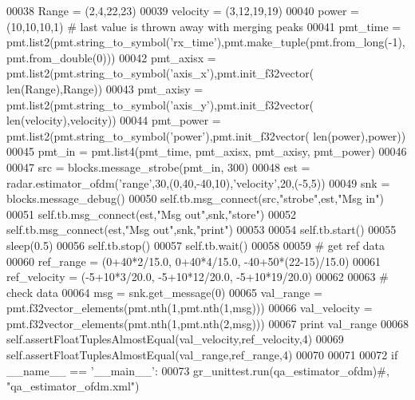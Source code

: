\begin{DoxyCode}
00038         Range = (2,4,22,23)
00039         velocity = (3,12,19,19)
00040         power = (10,10,10,1) \textcolor{comment}{# last value is thrown away with merging peaks}
00041         pmt\_time = pmt.list2(pmt.string\_to\_symbol(\textcolor{stringliteral}{'rx\_time'}),pmt.make\_tuple(pmt.from\_long(-1),
      pmt.from\_double(0)))
00042         pmt\_axisx = pmt.list2(pmt.string\_to\_symbol(\textcolor{stringliteral}{'axis\_x'}),pmt.init\_f32vector(
      len(Range),Range))
00043         pmt\_axisy = pmt.list2(pmt.string\_to\_symbol(\textcolor{stringliteral}{'axis\_y'}),pmt.init\_f32vector(
      len(velocity),velocity))
00044         pmt\_power = pmt.list2(pmt.string\_to\_symbol(\textcolor{stringliteral}{'power'}),pmt.init\_f32vector(
      len(power),power))
00045         pmt\_in = pmt.list4(pmt\_time, pmt\_axisx, pmt\_axisy, pmt\_power)
00046         
00047         src = blocks.message\_strobe(pmt\_in, 300)
00048         est = radar.estimator\_ofdm(\textcolor{stringliteral}{'range'},30,(0,40,-40,10),\textcolor{stringliteral}{'velocity'},20,(-5,5))
00049         snk = blocks.message\_debug()
00050         self.tb.msg\_connect(src,\textcolor{stringliteral}{"strobe"},est,\textcolor{stringliteral}{"Msg in"})
00051         self.tb.msg\_connect(est,\textcolor{stringliteral}{"Msg out"},snk,\textcolor{stringliteral}{"store"})
00052         self.tb.msg\_connect(est,\textcolor{stringliteral}{"Msg out"},snk,\textcolor{stringliteral}{"print"})
00053         
00054         self.tb.start()
00055         sleep(0.5)
00056         self.tb.stop()
00057         self.tb.wait()
00058         
00059         \textcolor{comment}{# get ref data}
00060         ref\_range = (0+40*2/15.0, 0+40*4/15.0, -40+50*(22-15)/15.0)
00061         ref\_velocity = (-5+10*3/20.0, -5+10*12/20.0, -5+10*19/20.0)
00062         
00063         \textcolor{comment}{# check data}
00064         msg = snk.get\_message(0)
00065         val\_range = pmt.f32vector\_elements(pmt.nth(1,pmt.nth(1,msg)))
00066         val\_velocity = pmt.f32vector\_elements(pmt.nth(1,pmt.nth(2,msg)))
00067         \textcolor{keywordflow}{print} val\_range
00068         self.assertFloatTuplesAlmostEqual(val\_velocity,ref\_velocity,4)
00069         self.assertFloatTuplesAlmostEqual(val\_range,ref\_range,4)
00070 
00071 
00072 \textcolor{keywordflow}{if} \_\_name\_\_ == \textcolor{stringliteral}{'\_\_main\_\_'}:
00073     gr\_unittest.run(qa\_estimator\_ofdm)\textcolor{comment}{#, "qa\_estimator\_ofdm.xml")}
\end{DoxyCode}

